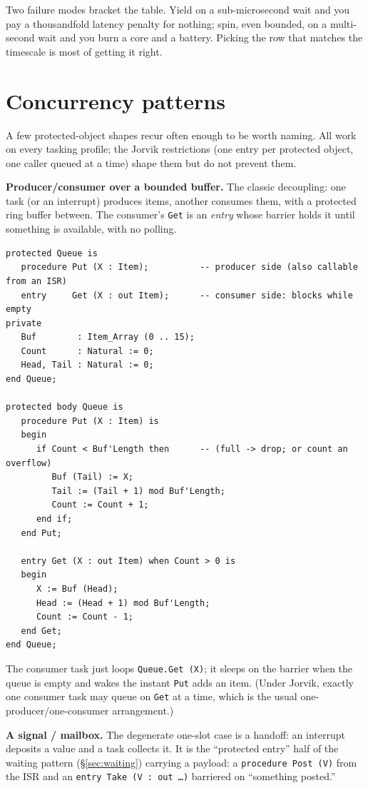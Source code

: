 Two failure modes bracket the table. Yield on a sub-microsecond wait and you pay a
thousandfold latency penalty for nothing; spin, even bounded, on a
multi-second wait and you burn a core and a battery. Picking the row that matches
the timescale is most of getting it right.

\section{Concurrency patterns}
\label{sec:concurrency}

A few protected-object shapes recur often enough to be worth naming. All work on
every tasking profile; the Jorvik restrictions (one entry per protected object,
one caller queued at a time) shape them but do not prevent them.

\textbf{Producer/consumer over a bounded buffer.} The classic decoupling: one
task (or an interrupt) produces items, another consumes them, with a protected
ring buffer between. The consumer's \texttt{Get} is an \emph{entry} whose barrier
holds it until something is available, with no polling.

\begin{lstlisting}
protected Queue is
   procedure Put (X : Item);          -- producer side (also callable from an ISR)
   entry     Get (X : out Item);      -- consumer side: blocks while empty
private
   Buf        : Item_Array (0 .. 15);
   Count      : Natural := 0;
   Head, Tail : Natural := 0;
end Queue;

protected body Queue is
   procedure Put (X : Item) is
   begin
      if Count < Buf'Length then      -- (full -> drop; or count an overflow)
         Buf (Tail) := X;
         Tail := (Tail + 1) mod Buf'Length;
         Count := Count + 1;
      end if;
   end Put;

   entry Get (X : out Item) when Count > 0 is
   begin
      X := Buf (Head);
      Head := (Head + 1) mod Buf'Length;
      Count := Count - 1;
   end Get;
end Queue;
\end{lstlisting}

The consumer task just loops \texttt{Queue.Get (X)}; it sleeps on the barrier when
the queue is empty and wakes the instant \texttt{Put} adds an item. (Under Jorvik,
exactly one consumer task may queue on \texttt{Get} at a time, which is the
usual one-producer/one-consumer arrangement.)

\textbf{A signal / mailbox.} The degenerate one-slot case is a handoff: an
interrupt deposits a value and a task collects it. It is the
``protected entry'' half of the waiting pattern (\S\ref{sec:waiting}) carrying a
payload: a \texttt{procedure Post (V)} from the ISR and an
\texttt{entry Take (V : out \ldots)} barriered on ``something posted.''

